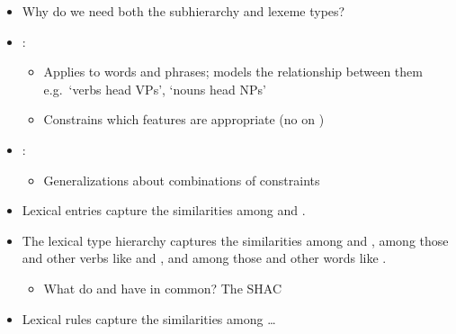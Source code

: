 \documentclass[a4paper,landscape,headrule,footrule]{foils}
\begin{document}
\begin{itemize}
\item Why do we need both the  subhierarchy
  and lexeme types?
\item {}:
  \begin{itemize}
  \item Applies to words and phrases; models the
    relationship between them
    \\ e.g.\ `verbs head VPs', `nouns head NPs'
  \item Constrains which features are appropriate
    (no  on )
  \end{itemize}
\item {}:
  \begin{itemize}
  \item Generalizations about combinations of
    constraints
  \end{itemize}
\end{itemize}

\begin{itemize}
\item Lexical entries capture the similarities among  and .
\item The lexical type hierarchy captures the similarities among
   and , among those and other verbs like
   and , and among those and other words like
  .
  \begin{itemize}
  \item What do  and  have in common?  The SHAC
  \end{itemize}
\item Lexical rules capture the similarities among \ldots
\end{itemize}
\end{document}
